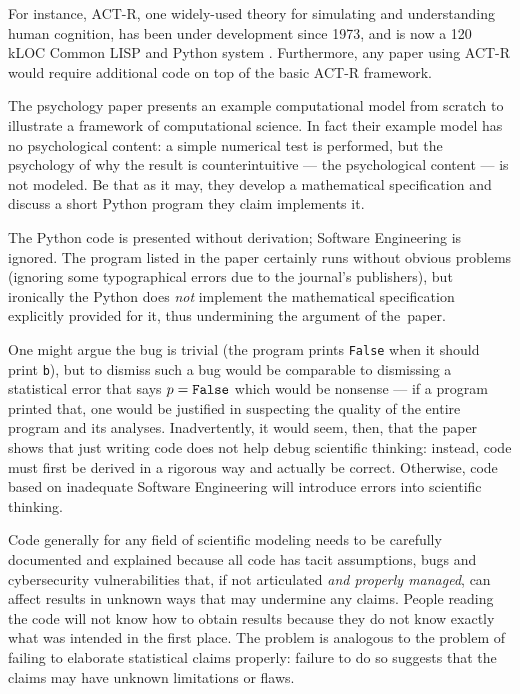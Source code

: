 \documentclass{comjnl}
\begin{document}
For instance, ACT-R, one widely-used theory for simulating and understanding human cognition, has been under development since 1973, and is now a 120 kLOC Common LISP and Python system \cite{actr}. Furthermore, any paper using ACT-R would require additional code on top of the basic ACT-R framework.

The psychology paper \cite{psychological-modeling} presents an example computational model from scratch to illustrate a framework of computational science. In fact their example model has no psychological content: a simple numerical test is performed, but the psychology of why the result is counterintuitive --- the psychological content --- is not modeled. Be that as it may, they develop a mathematical specification and discuss a short Python program they claim implements it. 

The Python code is presented without derivation; Software Engineering is ignored. The program listed in the paper certainly runs without obvious problems (ignoring some typographical errors due to the journal's publishers), but ironically the Python does \emph{not\/} implement the mathematical specification explicitly provided for it, thus undermining the argument of the~paper. 

One might argue the bug is trivial (the program prints \texttt{False} when it should print \texttt{b}), but to dismiss such a bug would be comparable to dismissing a statistical error that says $p=\mbox{\tt False}$ which would be nonsense --- if a program printed that, one would be justified in suspecting the quality of the entire program and its analyses. Inadvertently, it would seem, then, that the paper shows that just writing code does not help debug scientific thinking: instead, code must first be derived in a rigorous way and actually be correct. Otherwise, code based on inadequate Software Engineering will introduce errors into scientific thinking.

Code generally for any field of scientific modeling needs to be carefully documented and explained because all code has tacit assumptions, bugs and cybersecurity vulnerabilities \cite{Ben,nature-review,se-bias} that, if not articulated \emph{and properly managed}, can affect results in unknown ways that may undermine any claims. People reading the code will not know how to obtain results because they do not know exactly what was intended in the first place. The problem is analogous to the problem of failing to elaborate statistical claims properly: failure to do so suggests that the claims may have unknown limitations or flaws.
\end{document}
